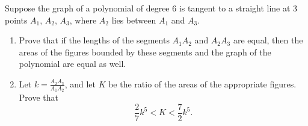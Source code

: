 \documentclass{article}
\begin{document}
\setlength{\parindent}{0pt}
Suppose the graph of a polynomial of degree $6$ is tangent to a straight line at $3$ points $A_{1}$, $A_{2}$, $A_{3}$, where $A_{2}$ lies between $A_{1}$ and $A_{3}$.
\begin{enumerate}[label=\alph*)]
\item Prove that if the lengths of the segments $A_{1}A_{2}$ and $A_{2}A_{3}$ are equal, then the areas of the figures bounded by these segments and the graph of the polynomial are equal as well.
\item Let $k=\frac{A_{2}A_{3}}{A_{1}A_{2}}$, and let $K$ be the ratio of the areas of the appropriate figures. Prove that$$\frac{2}{7}k^{5}<K<\frac{7}{2}k^{5}.$$
\end{enumerate}
\end{document}
